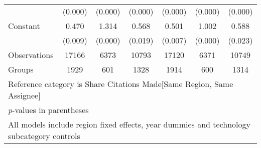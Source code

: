 \begin{sidewaystable}[htbp]
\begin{tabular}{l*{6}{c}}
                &  (0.000)&  (0.000)&  (0.000)&  (0.000)&  (0.000)&  (0.000)\\
Constant        &    0.470&    1.314&    0.568&    0.501&    1.002&    0.588\\
                &  (0.009)&  (0.000)&  (0.019)&  (0.007)&  (0.000)&  (0.023)\\
\hline
Observations    &    17166&     6373&    10793&    17120&     6371&    10749\\
Groups          &     1929&      601&     1328&     1914&      600&     1314\\
\hline\hline
\multicolumn{7}{l}{\footnotesize Reference category is Share Citations Made[Same Region, Same Assignee]}\\
\multicolumn{7}{l}{\footnotesize \textit{p}-values in parentheses}\\
\multicolumn{7}{l}{\footnotesize All models include region fixed effects, year dummies and technology subcategory controls}\\
\end{tabular}
\end{sidewaystable}
